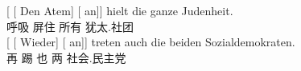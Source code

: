 \begin{exe}
\begin{xlist}[iv.]
\begin{exe}
\begin{xlist}[iv.]
\eal
\label{ex-complex-vf}
\ex
\gll {}[ [ Den Atem]  [ an]] hielt die ganze Judenheit.\footnotemark\\
       {}        {}         呼吸 {}    \partic{}  屏住   所有 犹太.社团\\
\ex\label{bsp-wieder-an-tritt-zwei}
\gll {}[ [ Wieder] [ an]] treten auch die beiden Sozialdemokraten.\footnotemark\\
      {}         {}        再   {}        \partic{} 踢 也  两 社会.民主党\\


\end{xlist}
\end{exe}
\end{xlist}
\end{exe}
